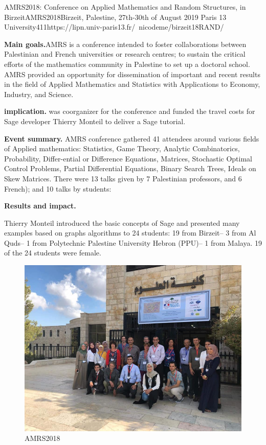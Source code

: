 \begin{event}{AMRS2018: Conference on Applied Mathematics and Random Structures, in Birzeit}{AMRS2018}{Birzeit, Palestine, 27th-30th of August 2019}
{Paris 13 University}{41}{1}{https://lipn.univ-paris13.fr/~nicodeme/birzeit18RAND/}

\textbf{Main goals.}AMRS is a conference intended to foster collaborations between Palestinian and French universities or research centres; 
to sustain the critical efforts of the mathematics community in Palestine to set up a doctoral school. AMRS provided an opportunity for dissemination of important and recent results in the field of Applied Mathematics and Statistics with Applications to Economy, Industry, and Science.

\textbf{\ODK implication.}
\ODK was coorganizer for the conference and funded the travel costs
for Sage developer Thierry Monteil to deliver a Sage tutorial.

\textbf{Event summary.}
AMRS conference gathered 41 attendees around various fields of Applied mathematics: Statistics, Game Theory, Analytic Combinatorics, 
Probability, Differ-ential or Difference Equations, Matrices,
Stochastic Optimal Control Problems, Partial Differential Equations, 
Binary Search Trees, Ideals on Skew Matrices. 
There were 13 talks given by 7 Palestinian professors, and 6 French); and 10 talks by students:

\textbf{Results and impact.}

Thierry Monteil introduced the basic concepts of Sage and presented
many examples based on graphs algorithms to 24 students: 19 from
Birzeit– 3 from Al Quds– 1 from Polytechnic Palestine University
Hebron (PPU)– 1 from Malaya. 19 of the 24 students were female.


\begin{figure}[ht]
  \includegraphics[width=.75\textwidth]{AMRS.png}
  \caption*{AMRS2018}
\end{figure}

\end{event}
